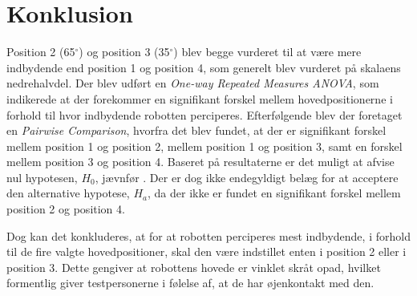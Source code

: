 \section*{Konklusion}
\label{Konklusion}
%
Position 2 (65$^{\circ}$) og position 3 (35$^{\circ}$) blev begge vurderet til at være mere indbydende end position 1 og position 4, som generelt blev vurderet på skalaens nedrehalvdel. Der blev udført en \textit{One-way Repeated Measures ANOVA}, som indikerede at der forekommer en signifikant forskel mellem hovedpositionerne i forhold til hvor indbydende robotten perciperes. Efterfølgende blev der foretaget en \textit{Pairwise Comparison}, hvorfra det blev fundet, at der er signifikant forskel mellem position 1 og position 2, mellem position 1 og position 3, samt en forskel mellem position 3 og position 4. Baseret på resultaterne er det muligt at afvise nul hypotesen, $H_0$, jævnfør . Der er dog ikke endegyldigt belæg for at acceptere den alternative hypotese, $H_a$, da der ikke er fundet en signifikant forskel mellem position 2 og position 4. 

Dog kan det konkluderes, at for at robotten perciperes mest indbydende, i forhold til de fire valgte hovedpositioner, skal den være indstillet enten i position 2 eller i position 3. Dette gengiver at robottens hovede er vinklet skråt opad, hvilket formentlig giver testpersonerne i følelse af, at de har øjenkontakt med den.       
